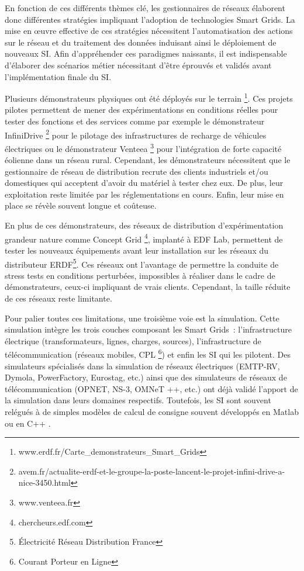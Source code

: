 En fonction de ces différents thèmes clé, les gestionnaires de réseaux élaborent donc différentes stratégies impliquant l'adoption de technologies Smart Grids. La mise en œuvre effective de ces stratégies nécessitent l'automatisation des actions sur le réseau et du traitement des données induisant ainsi le déploiement de nouveaux SI. Afin d'appréhender ces paradigmes naissants, il est indispensable d'élaborer des scénarios métier nécessitant d'être éprouvés et validés avant l'implémentation finale du SI.

Plusieurs démonstrateurs physiques ont été déployés sur le terrain \footnote{www.erdf.fr/Carte\_demonstrateurs\_Smart\_Grids}. Ces projets pilotes permettent de mener des expérimentations en conditions réelles pour tester des fonctions et des services comme par exemple le démonstrateur InfiniDrive \footnote{avem.fr/actualite-erdf-et-le-groupe-la-poste-lancent-le-projet-infini-drive-a-nice-3450.html} pour le pilotage des infrastructures de recharge de véhicules électriques ou le démonstrateur Venteea \footnote{www.venteea.fr} pour l'intégration de forte capacité éolienne dans un réseau rural. Cependant, les démonstrateurs nécessitent que le gestionnaire de réseau de distribution recrute des clients industriels et/ou domestiques qui acceptent d'avoir du matériel à tester chez eux. De plus, leur exploitation reste limitée par les réglementations en cours. Enfin, leur mise en place se révèle souvent longue et coûteuse. 

En plus de ces démonstrateurs, des réseaux de distribution d'expérimentation grandeur nature comme Concept Grid \footnote{chercheurs.edf.com}, implanté à EDF Lab, permettent de tester les nouveaux équipements avant leur installation sur les réseaux du distributeur ERDF\footnote{Électricité Réseau Distribution France}. Ces réseaux ont l'avantage de permettre la conduite de stress tests en conditions perturbées, impossibles à réaliser dans le cadre de démonstrateurs, ceux-ci impliquant de vrais clients. Cependant, la taille réduite de ces réseaux reste limitante.

Pour palier toutes ces limitations, une troisième voie est la simulation. Cette simulation intègre les trois couches composant les Smart Grids~: l'infrastructure électrique (transformateurs, lignes, charges, sources), l'infrastructure de télécommunication (réseaux mobiles, CPL \footnote{Courant Porteur en Ligne}) et enfin les SI qui les pilotent. Des simulateurs spécialisés dans la simulation de réseaux électriques (EMTP-RV, Dymola, PowerFactory, Eurostag, etc.) ainsi que des simulateurs de réseaux de télécommunication (OPNET, NS-3, OMNeT ++, etc.) ont déjà validé l'apport de la simulation dans leurs domaines respectifs. Toutefois, les SI sont souvent relégués à de simples modèles de calcul de consigne souvent développés en Matlab ou en C++ \cite{palensky2014simulating}. 

